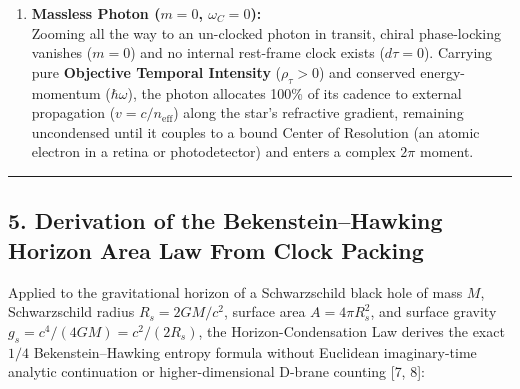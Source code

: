 \documentclass[
]{article}
\begin{document}
\begin{enumerate}
  Between boundary couplings, its spatial situating opens into
  \textbf{Functional Infinity} (\(\Omega\)) across its Compton coherence
  envelope; upon boundary interaction (\(\Delta\Omega > 0\)), one
  \(2\pi\) cycle precipitates a localized particle event
  (\(A_s^v \to A_{s'}^{v+1}\)). Its solitary phase-lock remains intact
  until horizon temperature reaches
  \(k_B T_{\mathrm{crit}} = m_e c^2 / (2\pi) \approx 81.3\ \text{keV}\)
  (\(T_{\mathrm{crit}} \approx 9.44 \times 10^8\ \text{K}\)), where
  spontaneous \(e^- e^+\) pair condensation overwhelms individual
  identity.
\item
  \textbf{Massless Photon (\(m = 0\), \(\omega_C = 0\)):}\\
  Zooming all the way to an un-clocked photon in transit, chiral
  phase-locking vanishes (\(m = 0\)) and no internal rest-frame clock
  exists (\(d\tau = 0\)). Carrying pure \textbf{Objective Temporal
  Intensity} (\(\rho_\tau > 0\)) and conserved energy-momentum
  (\(\hbar\omega\)), the photon allocates 100\% of its cadence to
  external propagation (\(v = c/n_{\mathrm{eff}}\)) along the star's
  refractive gradient, remaining uncondensed until it couples to a bound
  Center of Resolution (an atomic electron in a retina or photodetector)
  and enters a complex \(2\pi\) moment.
\end{enumerate}

\begin{center}\rule{0.5\linewidth}{0.5pt}\end{center}

\subsection{5. Derivation of the Bekenstein--Hawking Horizon Area Law
From Clock
Packing}\label{derivation-of-the-bekensteinhawking-horizon-area-law-from-clock-packing}

Applied to the gravitational horizon of a Schwarzschild black hole of
mass \(M\), Schwarzschild radius \(R_s = 2GM/c^2\), surface area
\(A = 4\pi R_s^2\), and surface gravity
\(g_s = c^4/(4GM) = c^2/(2R_s)\), the Horizon-Condensation Law derives
the exact \(1/4\) Bekenstein--Hawking entropy formula without Euclidean
imaginary-time analytic continuation or higher-dimensional D-brane
counting {[}7, 8{]}:
\end{document}
